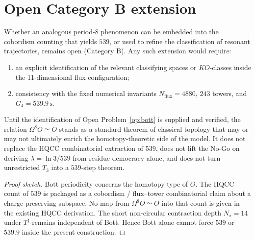\section{Open Category B extension}

\begin{openproblem}
\label{op:bott}
Whether an analogous period-8 phenomenon can be embedded into the cobordism
counting that yields \(539\), or used to refine the classification of resonant
trajectories, remains open (Category B). Any such extension would require:
\begin{enumerate}[label=(\roman*)]
  \item an explicit identification of the relevant classifying spaces or
        \(KO\)-classes inside the 11-dimensional flux configuration;
  \item consistency with the fixed numerical invariants
        \(N_{\mathrm{flux}}=4880\), \(243\) towers, and \(G_4=539.9\,\mathrm{s}\).
\end{enumerate}
\end{openproblem}

\begin{theorem}
\label{thm:bott-not-539}
Until the identification of Open Problem~\ref{op:bott} is supplied and verified,
the relation \(\Omega^8 O\simeq O\) stands as a standard theorem of classical
topology that may or may not ultimately enrich the homotopy-theoretic side of
the model. It does not replace the HQCC combinatorial extraction of \(539\),
does not lift the No-Go on deriving \(\lambda=\ln 3/539\) from residue democracy
alone, and does not turn unrestricted \(T_3\) into a \(539\)-step theorem.
\end{theorem}

\begin{proof}[Proof sketch]
Bott periodicity concerns the homotopy type of \(O\). The HQCC count of \(539\)
is packaged as a cobordism / flux--tower combinatorial claim about a
charge-preserving subspace. No map from \(\Omega^8 O\simeq O\) into that count
is given in the existing HQCC derivation. The short non-circular contraction
depth \(N_\star=14\) under \(T^\sharp\) remains independent of Bott. Hence Bott
alone cannot force \(539\) or \(539.9\) inside the present construction.
\end{proof}


